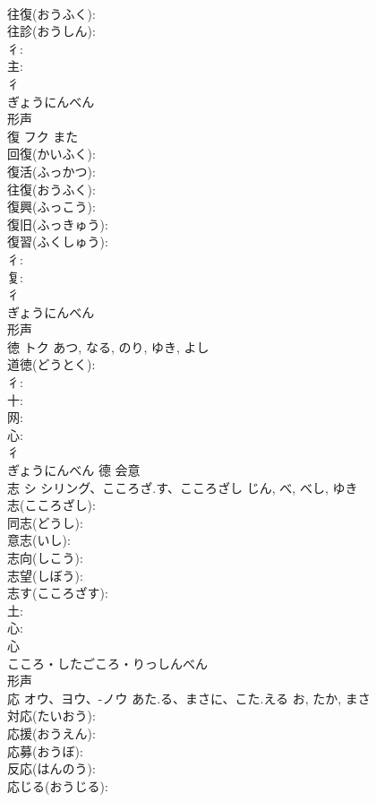 \documentclass[8pt]{extreport}
\begin{document}
\begin{CJK}{UTF8}{min}
\\	往復(おうふく): 
\\	往診(おうしん): 
\\	彳: 
\\	主: 
\\	彳	
\\	ぎょうにんべん	
\\	形声 
\\	復	フク	また		
\\	回復(かいふく): 
\\	復活(ふっかつ): 
\\	往復(おうふく): 
\\	復興(ふっこう): 
\\	復旧(ふっきゅう): 
\\	復習(ふくしゅう): 
\\	彳: 
\\	复: 
\\	彳	
\\	ぎょうにんべん	
\\	形声 
\\	徳	トク		あつ, なる, のり, ゆき, よし	
\\	道徳(どうとく): 
\\	彳: 
\\	十: 
\\	网: 
\\	心: 
\\	彳	
\\	ぎょうにんべん	德	会意 
\\	志	シ	シリング、こころざ.す、こころざし	じん, べ, べし, ゆき	
\\	志(こころざし): 
\\	同志(どうし): 
\\	意志(いし): 
\\	志向(しこう): 
\\	志望(しぼう): 
\\	志す(こころざす): 
\\	土: 
\\	心: 
\\	心	
\\	こころ・したごころ・りっしんべん	
\\	形声 
\\	応	オウ、ヨウ、-ノウ	あた.る、まさに、こた.える	お, たか, まさ	
\\	対応(たいおう): 
\\	応援(おうえん): 
\\	応募(おうぼ): 
\\	反応(はんのう): 
\\	応じる(おうじる): 

\end{CJK}
\end{document}
